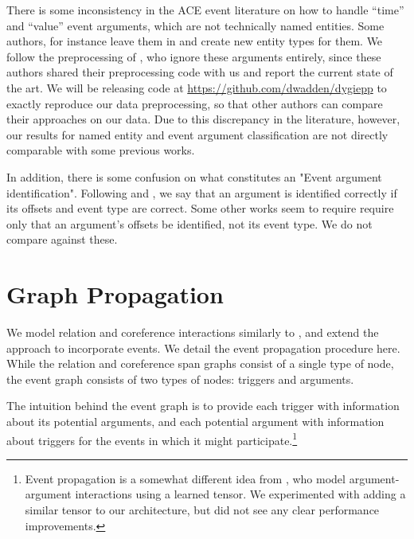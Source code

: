 \documentclass[11pt,a4paper]{article}
\newcommand{\bg}{{\mathbf{g}}}
\newcommand{\bh}{{\mathbf{h}}}
\newcommand{\bu}{{\mathbf{u}}}
\newcommand{\bV}{{\mathbf{V}}}
\newcommand{\bW}{{\mathbf{W}}}
\begin{document}
There is some inconsistency in the ACE event literature on how to handle ``time'' and ``value'' event arguments, which are not technically named entities. Some authors, for instance  leave them in and create new entity types for them. We follow the preprocessing of , who ignore these arguments entirely, since these authors shared their preprocessing code with us and report the current state of the art. We will be releasing code at \url{https://github.com/dwadden/dygiepp} to exactly reproduce our data preprocessing, so that other authors can compare their approaches on our data. Due to this discrepancy in the literature, however, our results for named entity and event argument classification are not directly comparable with some previous works.

In addition, there is some confusion on what constitutes an "Event argument identification". Following  and , we say that an argument is identified correctly if its offsets and event type are correct. Some other works seem to require require only that an argument's offsets be identified, not its event type. We do not compare against these.

\section{Graph Propagation} \label{sec:event_graph}

\newcommand{\trig}{\bh_i}
\newcommand{\argu}{\bg_j}
\newcommand{\simil}{\bV_A^t(i, j)}
\newcommand{\similprime}{\bV_A^{t'}(i, j)}
\newcommand{\updateArgTrig}{\bu^t_{A \to T}(i)}
\newcommand{\gateArgTrig}{f_{A \to T}^t(i)}
\newcommand{\weightArgTrig}{\bW_{A \to T}}
\newcommand{\updateTrigArg}{\bu^t_{T \to A}(j)}
\newcommand{\gateTrigArg}{f_{T \to A}^t(j)}

We model relation and coreference interactions similarly to \citet{luan2019general}, and extend the approach to incorporate events. We detail the event propagation procedure here. While the relation and coreference span graphs consist of a single type of node, the event graph consists of two types of nodes: triggers and arguments.

The intuition behind the event graph is to provide each trigger with information about its potential arguments, and each potential argument with information about triggers for the events in which it might participate.\footnote{Event propagation is a somewhat different idea from \cite{Sha2018JointlyEE}, who model argument-argument interactions using a learned tensor. We experimented with adding a similar tensor to our architecture, but did not see any clear performance improvements.}
\end{document}
